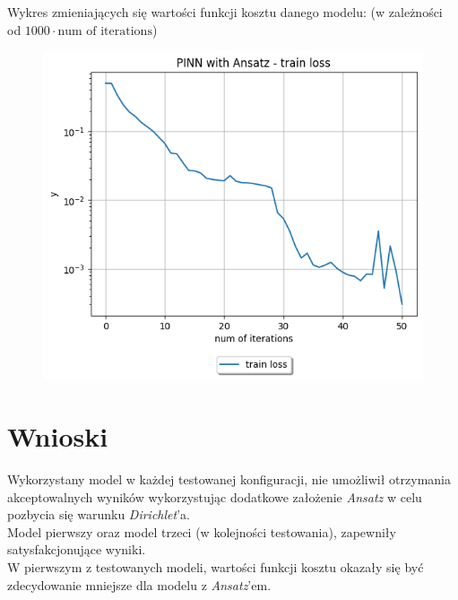 \documentclass{article}
\begin{document}
Wykres zmieniających się wartości funkcji kosztu danego modelu:
(w zależności od $1000 \cdot \text{num of iterations}$)\\

\begin{figure}[H]
  \includegraphics[width=\linewidth]{figures/3_ans_train.png}
\end{figure}


\section*{Wnioski}
\null\quad
Wykorzystany model w każdej testowanej konfiguracji, nie umożliwił otrzymania
akceptowalnych wyników wykorzystując dodatkowe założenie \textit{Ansatz} w celu pozbycia
się warunku \textit{Dirichlet}'a.\\
Model pierwszy oraz model trzeci (w kolejności testowania), zapewniły satysfakcjonujące wyniki.\\
W pierwszym z testowanych modeli, wartości funkcji kosztu okazały się być zdecydowanie mniejsze
dla modelu z \textit{Ansatz}'em.
\end{document}
